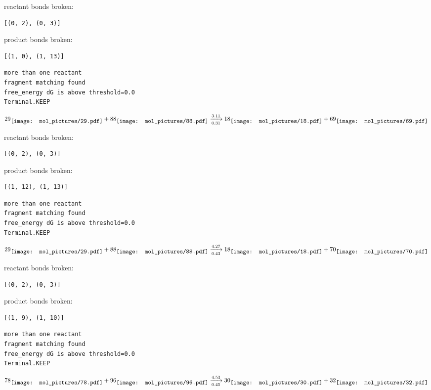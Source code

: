 \documentclass{article}
\begin{document}
reactant bonds broken:\begin{verbatim}
[(0, 2), (0, 3)]
\end{verbatim}
product bonds broken:\begin{verbatim}
[(1, 0), (1, 13)]
\end{verbatim}




\vspace{1cm}
\begin{verbatim}
more than one reactant
fragment matching found
free_energy dG is above threshold=0.0
Terminal.KEEP
\end{verbatim}
$$
29
\raisebox{-.5\height}{\texttt{[image: mol\_pictures/29.pdf]}}
+
88
\raisebox{-.5\height}{\texttt{[image: mol\_pictures/88.pdf]}}
\xrightarrow[0.31]{3.11}
18
\raisebox{-.5\height}{\texttt{[image: mol\_pictures/18.pdf]}}
+
69
\raisebox{-.5\height}{\texttt{[image: mol\_pictures/69.pdf]}}
$$


reactant bonds broken:\begin{verbatim}
[(0, 2), (0, 3)]
\end{verbatim}
product bonds broken:\begin{verbatim}
[(1, 12), (1, 13)]
\end{verbatim}




\vspace{1cm}
\begin{verbatim}
more than one reactant
fragment matching found
free_energy dG is above threshold=0.0
Terminal.KEEP
\end{verbatim}
$$
29
\raisebox{-.5\height}{\texttt{[image: mol\_pictures/29.pdf]}}
+
88
\raisebox{-.5\height}{\texttt{[image: mol\_pictures/88.pdf]}}
\xrightarrow[0.43]{4.27}
18
\raisebox{-.5\height}{\texttt{[image: mol\_pictures/18.pdf]}}
+
70
\raisebox{-.5\height}{\texttt{[image: mol\_pictures/70.pdf]}}
$$


reactant bonds broken:\begin{verbatim}
[(0, 2), (0, 3)]
\end{verbatim}
product bonds broken:\begin{verbatim}
[(1, 9), (1, 10)]
\end{verbatim}




\vspace{1cm}
\begin{verbatim}
more than one reactant
fragment matching found
free_energy dG is above threshold=0.0
Terminal.KEEP
\end{verbatim}
$$
78
\raisebox{-.5\height}{\texttt{[image: mol\_pictures/78.pdf]}}
+
96
\raisebox{-.5\height}{\texttt{[image: mol\_pictures/96.pdf]}}
\xrightarrow[0.45]{4.53}
30
\raisebox{-.5\height}{\texttt{[image: mol\_pictures/30.pdf]}}
+
32
\raisebox{-.5\height}{\texttt{[image: mol\_pictures/32.pdf]}}
$$
\end{document}

